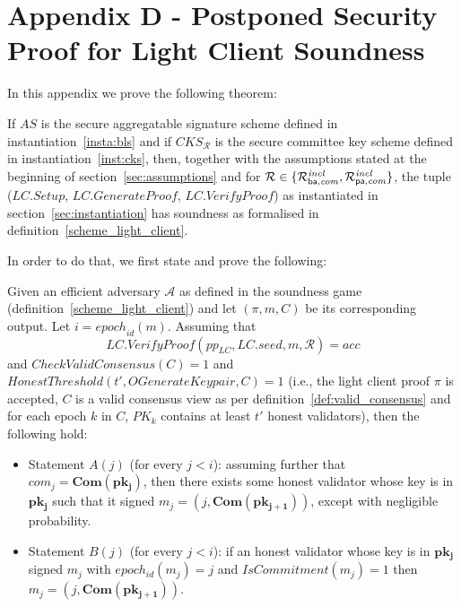 \section{Appendix D - Postponed Security Proof for Light Client Soundness}
\label{sec:proof_sec_soundness}

\noindent In this appendix we prove the following theorem:
\begin{theorem} 
\label{thm_lc_soundness}
If $\mathit{AS}$ is the secure aggregatable signature scheme defined in instantiation~\ref{insta:bls} and if 
$\mathit{CKS_{\mathcal{R}}}$ is the secure committee key scheme defined in instantiation~\ref{inst:cks}, 
then, together with the assumptions stated at the beginning of section~\ref{sec:assumptions} and for 
$\mathcal{R} \in \{ \mathcal{R}^{\mathit{incl}}_{\mathsf{ba},\mathit{com}}, \mathcal{R}^{\mathit{incl}}_{\mathsf{pa},\mathit{com}} \}$, the tuple ($\mathit{LC.Setup}$, $\mathit{LC.GenerateProof}$, $\mathit{LC.VerifyProof}$) 
as instantiated in section~\ref{sec:instantiation} has soundness as formalised in definition~\ref{scheme_light_client}. 
\end{theorem}

\noindent In order to do that, we first state and prove the following: 
\begin{proposition} 
\label{le:lc_soundness}
Given an efficient adversary $\mathcal{A}$ as defined in the soundness game 
(definition~\ref{scheme_light_client}) and let $(\pi, m, C)$ be its corresponding output. 
Let $i = \mathit{epoch}_{\mathit{id}}(m)$. Assuming that 
$$\mathit{LC.VerifyProof}(\mathit{pp}_{\mathit{LC}}, \mathit{LC.seed}, m, \mathcal{R}) = \mathit{acc}$$ and 
$\mathit{CheckValidConsensus}(C) = 1$ and 
$\mathit{HonestThreshold}(t', \mathit{OGenerateKeypair}, C) = 1$ (i.e., the light client proof $\pi$ is accepted, 
$C$ is a valid consensus view as per definition~\ref{def:valid_consensus} and for each epoch $k$ in $C$, $PK_k$ 
contains at least $t'$ honest validators), then the following hold:
\begin{itemize}
\item Statement $A(j)$ (for every $j < i$): assuming further that $\mathit{com_j} = \mathbf{Com}(\mathbf{pk_j})$, %
then there exists some honest validator whose key is in $\mathbf{pk_j}$ such that it signed 
$m_j = (j, \mathbf{Com}(\mathbf{pk_{j+1}}))$, except with negligible probability.
\item Statement $B(j)$ (for every $j < i$): if an honest validator whose key is in $\mathbf{pk_j}$ 
signed $m_j$ with $\mathit{epoch_{\mathit{id}}}(m_j) = j$ and 
$\mathit{IsCommitment}(m_j) =1$ then $m_j= (j, \mathbf{Com}(\mathbf{pk_{j+1}}))$.
\end{itemize}
\end{proposition}

